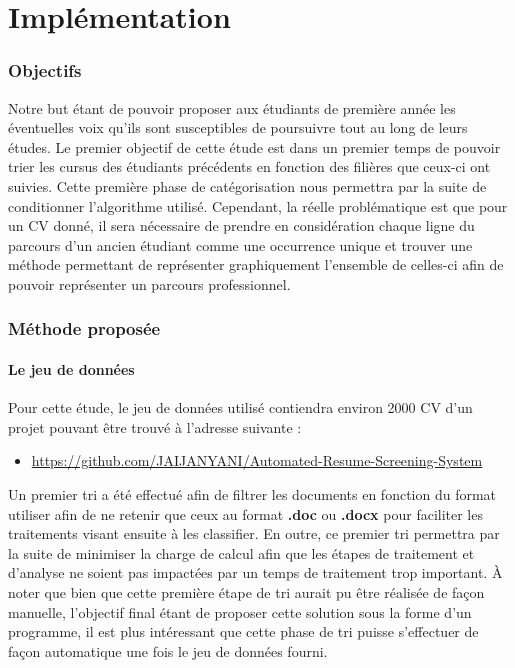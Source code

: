 \documentclass[memoire.tex]{subfiles}
\begin{document}
\chapter{Implémentation}

\subsection{Objectifs}

Notre but étant de pouvoir proposer aux étudiants de première année les éventuelles voix qu'ils sont susceptibles de poursuivre tout au long de leurs études. Le premier objectif de cette étude est dans un premier temps de pouvoir trier les cursus des étudiants précédents en fonction des filières que ceux-ci ont suivies. Cette première phase de catégorisation nous permettra par la suite de conditionner l'algorithme utilisé. Cependant, la réelle problématique est que pour un CV donné, il sera nécessaire de prendre en considération chaque ligne du parcours d'un ancien étudiant comme une occurrence unique et trouver une méthode permettant de représenter graphiquement l'ensemble de celles-ci afin de pouvoir représenter un parcours professionnel.

\subsection{Méthode proposée}

\subsubsection{Le jeu de données}

Pour cette étude, le jeu de données utilisé contiendra environ 2000 CV  d'un projet pouvant être trouvé à l'adresse suivante : \begin{itemize}
\item \url{https://github.com/JAIJANYANI/Automated-Resume-Screening-System}
\end{itemize}
Un premier tri a été effectué afin de filtrer les documents en fonction du format utiliser afin de ne retenir que ceux au format \textbf{.doc} ou \textbf{.docx} pour faciliter les traitements visant ensuite à les classifier. En outre, ce premier tri permettra par la suite de minimiser la charge de calcul afin que les étapes de traitement et d'analyse ne soient pas impactées par un temps de traitement trop important. À noter que bien que cette première étape de tri aurait pu être réalisée de façon manuelle, l'objectif final étant de proposer cette solution sous la forme d'un programme, il est plus intéressant que cette phase de tri puisse s'effectuer de façon automatique une fois le jeu de données fourni.
\end{document}
